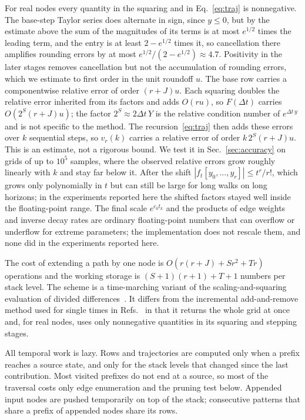 For real nodes every quantity in the squaring and in Eq.~\eqref{eq:traj} is nonnegative. The base-step Taylor series does alternate in sign, since $y\le0$, but by the estimate above the sum of the magnitudes of its terms is at most $e^{1/2}$ times the leading term, and the entry is at least $2-e^{1/2}$ times it, so cancellation there amplifies rounding errors by at most $e^{1/2}/(2-e^{1/2})\approx4.7$. Positivity in the later stages removes cancellation but not the accumulation of rounding errors, which we estimate to first order in the unit roundoff $u$. The base row carries a componentwise relative error of order $(r+J)u$. Each squaring doubles the relative error inherited from its factors and adds $O(ru)$, so $F(\Delta t)$ carries $O(2^S(r+J)u)$; the factor $2^S\approx2\Delta t\,Y$ is the relative condition number of $e^{\Delta t\,y}$ and is not specific to the method. The recursion~\eqref{eq:traj} then adds these errors over $k$ sequential steps, so $v_r(k)$ carries a relative error of order $k\,2^S(r+J)u$. This is an estimate, not a rigorous bound. We test it in Sec.~\ref{sec:accuracy} on grids of up to $10^5$ samples, where the observed relative errors grow roughly linearly with $k$ and stay far below it. After the shift $|f_{t}[y_0,\dots,y_r]|\le t^r/r!$, which grows only polynomially in $t$ but can still be large for long walks on long horizons; in the experiments reported here the shifted factors stayed well inside the floating-point range. The final scale $e^{c_0t_k}$ and the products of edge weights and inverse decay rates are ordinary floating-point numbers that can overflow or underflow for extreme parameters; the implementation does not rescale them, and none did in the experiments reported here.

The cost of extending a path by one node is $O(r(r+J)+Sr^2+Tr)$ operations and the working storage is $(S+1)(r+1)+T+1$ numbers per stack level. The scheme is a time-marching variant of the scaling-and-squaring evaluation of divided differences~\cite{mccurdy1984,caliari2007,zivcovich2019}. It differs from the incremental add-and-remove method used for single times in Refs.~\cite{gupta2020dd,barash2022} in that it returns the whole grid at once and, for real nodes, uses only nonnegative quantities in its squaring and stepping stages.

All temporal work is lazy. Rows and trajectories are computed only when a prefix reaches a source state, and only for the stack levels that changed since the last contribution. Most visited prefixes do not end at a source, so most of the traversal costs only edge enumeration and the pruning test below. Appended input nodes are pushed temporarily on top of the stack; consecutive patterns that share a prefix of appended nodes share its rows.

